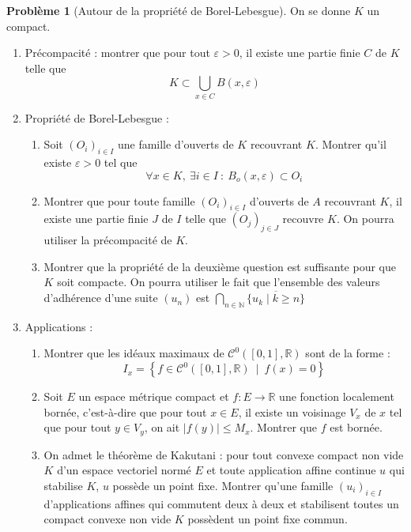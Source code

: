 \documentclass[french]{book}
\newcommand{\N}{\mathbb{N}}
\newcommand{\R}{\mathbb{R}}
\theoremstyle{definition}
\newtheorem{pro}{Problème}[chapter]
\theoremstyle{remark}
\begin{document}
\begin{pro}[Autour de la propriété de Borel-Lebesgue]
	On se donne $K$ un compact.
	\begin{enumerate}
		\item  Précompacité : montrer que pour tout $\varepsilon>0$, il existe une partie finie $C$ de $K$ telle que $$K\subset\bigcup_{x\in C}B(x,\varepsilon)$$
		\item Propriété de Borel-Lebesgue :
		\begin{enumerate}[label=\alph*.]
			\item Soit $(O_i)_{i\in I}$ une famille d'ouverts de $K$ recouvrant $K$. Montrer qu'il existe $\varepsilon>0$ tel que $$\forall x\in K,\ \exists i\in I\ : \ B_o(x,\varepsilon)\subset O_i$$
			\item Montrer que pour toute famille $(O_i)_{i\in I}$ d'ouverts de $A$ recouvrant $K$, il existe une partie finie $J$ de $I$ telle que $(O_j)_{j\in J}$ recouvre $K$. On pourra utiliser la précompacité de $K$.
			\item Montrer que la propriété de la deuxième question est suffisante pour que $K$ soit compacte. On pourra utiliser le fait que l'ensemble des valeurs d'adhérence d'une suite $(u_n)$ est $\displaystyle\bigcap_{n\in\N}\overline{\{u_k\mid k\geqslant n\}}$
		\end{enumerate}
		\item Applications :
		\begin{enumerate}[label=\alph*.]
			\item Montrer que les idéaux maximaux de $\mathcal{C}^0([0,1],\R)$ sont de la forme : $$I_x=\left\{f\in\mathcal{C}^0([0,1],\R)\ \mid\ f(x)=0\right\}$$
			\item Soit $E$ un espace métrique compact et $f:E\to\R$ une fonction localement bornée, c'est-à-dire que pour tout $x\in E$, il existe un voisinage $V_x$ de $x$ tel que pour tout $y\in V_y$, on ait $\lvert f(y)\rvert\leqslant M_x$. Montrer que $f$ est bornée.
			\item On admet le théorème de Kakutani : pour tout convexe compact non vide $K$ d'un espace vectoriel normé $E$ et toute application affine continue $u$ qui stabilise $K$, $u$ possède un point fixe. Montrer qu'une famille $(u_i)_{i\in I}$ d'applications affines qui commutent deux à deux et stabilisent toutes un compact convexe non vide $K$ possèdent un point fixe commun.
		\end{enumerate}
	\end{enumerate}
\end{pro}
\end{document}
